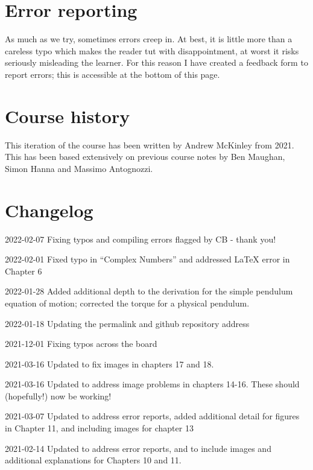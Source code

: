 \documentclass[
]{book}
\begin{document}
\hypertarget{error-reporting}{%
\section*{Error reporting}\label{error-reporting}}

As much as we try, sometimes errors creep in. At best, it is little more than a careless typo which makes the reader tut with disappointment, at worst it risks seriously misleading the learner. For this reason I have created a feedback form to report errors; this is accessible at the bottom of this page.

\hypertarget{course-history}{%
\section*{Course history}\label{course-history}}

This iteration of the course has been written by Andrew McKinley from 2021. This has been based extensively on previous course notes by Ben Maughan, Simon Hanna and Massimo Antognozzi.

\hypertarget{sec:changelog}{%
\section*{Changelog}\label{sec:changelog}}

2022-02-07 Fixing typos and compiling errors flagged by CB - thank you!

2022-02-01 Fixed typo in ``Complex Numbers'' and addressed LaTeX error in Chapter 6

2022-01-28 Added additional depth to the derivation for the simple pendulum equation of motion; corrected the torque for a physical pendulum.

2022-01-18 Updating the permalink and github repository address

2021-12-01 Fixing typos across the board

2021-03-16 Updated to fix images in chapters 17 and 18.

2021-03-16 Updated to address image problems in chapters 14-16. These should (hopefully!) now be working!

2021-03-07 Updated to address error reports, added additional detail for figures in Chapter 11, and including images for chapter 13

2021-02-14 Updated to address error reports, and to include images and additional explanations for Chapters 10 and 11.
\end{document}
